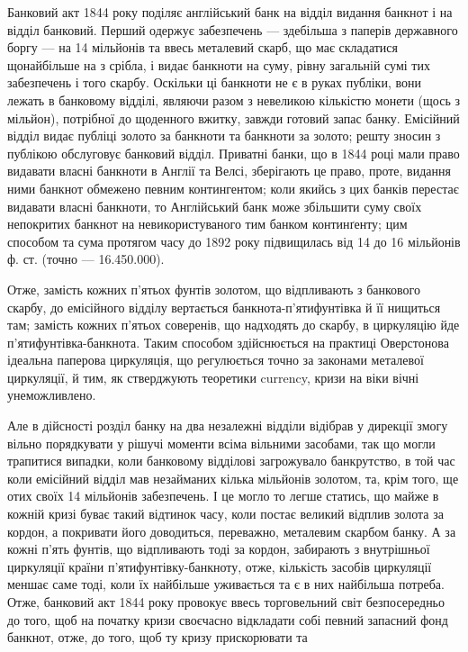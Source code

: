 Банковий акт 1844 року поділяє англійський банк на відділ видання банкнот
і на відділ банковий. Перший одержує забезпечень — здебільша з паперів державного
боргу — на 14 мільйонів та ввесь металевий скарб, що має складатися
щонайбільше на  з срібла, і видає банкноти на суму, рівну загальній сумі
тих забезпечень і того скарбу. Оскільки ці банкноти не є в руках публіки, вони
лежать в банковому відділі, являючи разом з невеликою кількістю монети (щось
з мільйон), потрібної до щоденного вжитку, завжди готовий запас банку. Емісійний
відділ видає публіці золото за банкноти та банкноти за золото; решту
зносин з публікою обслуговує банковий відділ. Приватні банки, що в 1844 році
мали право видавати власні банкноти в Англії та Велсі, зберігають це право,
проте, видання ними банкнот обмежено певним контингентом; коли якийсь з цих
банків перестає видавати власні банкноти, то Англійський банк може збільшити
суму своїх непокритих банкнот на  невикористуваного тим банком континґенту;
цим способом та сума протягом часу до 1892 року підвищилась від 14 до 16
мільйонів ф. ст. (точно — \num{16.450.000}).

Отже, замість кожних п’ятьох фунтів золотом, що відпливають з банкового
скарбу, до емісійного відділу вертається банкнота-п’ятифунтівка й її
нищиться там; замість кожних п’ятьох соверенів, що надходять до скарбу, в
циркуляцію йде п’ятифунтівка-банкнота. Таким способом здійснюється на практиці
Оверстонова ідеальна паперова циркуляція, що регулюється точно за законами
металевої циркуляції, й тим, як стверджують теоретики currency, кризи на віки
вічні унеможливлено.

Але в дійсності розділ банку на два незалежні відділи відібрав у дирекції
змогу вільно порядкувати у рішучі моменти всіма вільними засобами, так що
могли трапитися випадки, коли банковому відділові загрожувало банкрутство, в
той час коли емісійний відділ мав незайманих кілька мільйонів золотом, та, крім
того, ще отих своїх 14 мільйонів забезпечень. І це могло то легше статись, що
майже в кожній кризі буває такий відтинок часу, коли постає великий відплив
золота за кордон, а покривати його доводиться, переважно, металевим скарбом
банку. А за кожні п’ять фунтів, що відпливають тоді за кордон, забирають з
внутрішньої циркуляції країни п’ятифунтівку-банкноту, отже, кількість засобів
циркуляції меншає саме тоді, коли їх найбільше уживається та є в них найбільша
потреба. Отже, банковий акт 1844 року провокує ввесь торговельний
світ безпосередньо до того, щоб на початку кризи своєчасно відкладати собі певний
запасний фонд банкнот, отже, до того, щоб ту кризу прискорювати та
\parbreak{}  %
